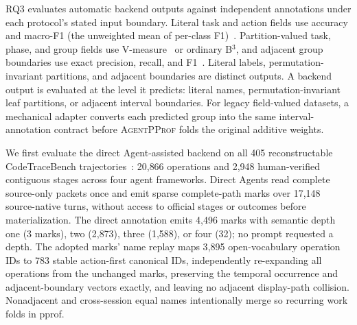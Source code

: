 \documentclass[letterpaper]{article}
\newcommand{\sys}{\textsc{AgentPProf}\xspace}
\begin{document}
RQ3 evaluates automatic backend outputs against independent annotations under
each protocol's stated input boundary. Literal task and action fields use
accuracy and macro-F1 (the unweighted mean of per-class F1)~\cite{lewis2004rcv1}.
Partition-valued task,
phase, and group fields use V-measure~\cite{rosenberg-hirschberg-2007-v-measure}
or ordinary B$^3$, and adjacent group
boundaries use exact precision, recall, and F1~\cite{ruokolainen2016segmentation}.
Literal labels, permutation-invariant partitions, and adjacent boundaries are
distinct outputs.
A backend output is evaluated at the level it predicts: literal names,
permutation-invariant leaf partitions, or adjacent interval boundaries. For
legacy field-valued datasets, a mechanical adapter converts each predicted
group into the same interval-annotation contract before \sys folds the
original additive weights.

We first evaluate the direct Agent-assisted backend on all 405 reconstructable
CodeTraceBench trajectories~\cite{li2026codetracer}: 20{,}866 operations and
2{,}948 human-verified contiguous stages across four agent frameworks. Direct
Agents read complete source-only packets once and emit sparse complete-path
marks over 17{,}148 source-native turns, without access to official stages or
outcomes before materialization. The direct annotation emits 4{,}496 marks
with semantic depth one (3 marks), two (2{,}873), three (1{,}588), or four
(32); no prompt requested a depth.
The adopted marks' name replay maps 3{,}895 open-vocabulary operation IDs to
783 stable action-first canonical IDs, independently re-expanding all
operations from the unchanged marks, preserving the temporal occurrence and
adjacent-boundary vectors exactly, and leaving no adjacent display-path
collision. Nonadjacent and cross-session equal names intentionally merge so
recurring work folds in pprof.
\end{document}
